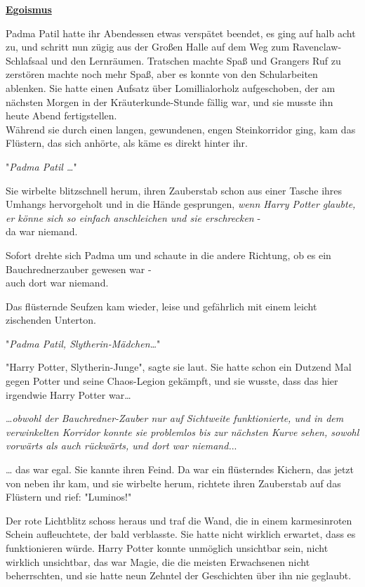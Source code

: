 

\hypertarget{egoismus}{%

\textbf{\uline{Egoismus}}

Padma Patil hatte ihr Abendessen etwas verspätet beendet, es ging auf halb acht zu, und schritt nun zügig aus der Großen Halle auf dem Weg zum Ravenclaw-Schlafsaal und den Lernräumen. Tratschen machte Spaß und Grangers Ruf zu zerstören machte noch mehr Spaß, aber es konnte von den Schularbeiten ablenken. Sie hatte einen Aufsatz über Lomillialorholz aufgeschoben, der am nächsten Morgen in der Kräuterkunde-Stunde fällig war, und sie musste ihn heute Abend fertigstellen.\\ Während sie durch einen langen, gewundenen, engen Steinkorridor ging, kam das Flüstern, das sich anhörte, als käme es direkt hinter ihr.

"\emph{Padma Patil …}"

Sie wirbelte blitzschnell herum, ihren Zauberstab schon aus einer Tasche ihres Umhangs hervorgeholt und in die Hände gesprungen, \emph{wenn Harry Potter glaubte, er könne sich so einfach anschleichen und sie erschrecken} -\\ da war niemand.

Sofort drehte sich Padma um und schaute in die andere Richtung, ob es ein Bauchrednerzauber gewesen war -\\ auch dort war niemand.

Das flüsternde Seufzen kam wieder, leise und gefährlich mit einem leicht zischenden Unterton.

"\emph{Padma Patil, Slytherin-Mädchen…}"

"Harry Potter, Slytherin-Junge", sagte sie laut. Sie hatte schon ein Dutzend Mal gegen Potter und seine Chaos-Legion gekämpft, und sie wusste, dass das hier irgendwie Harry Potter war…

…\emph{obwohl der Bauchredner-Zauber nur auf Sichtweite funktionierte, und in dem verwinkelten Korridor konnte sie problemlos bis zur nächsten Kurve sehen, sowohl vorwärts als auch rückwärts, und dort war niemand.}..

… das war egal. Sie kannte ihren Feind. Da war ein flüsterndes Kichern, das jetzt von neben ihr kam, und sie wirbelte herum, richtete ihren Zauberstab auf das Flüstern und rief: "Luminos!"

Der rote Lichtblitz schoss heraus und traf die Wand, die in einem karmesinroten Schein aufleuchtete, der bald verblasste. Sie hatte nicht wirklich erwartet, dass es funktionieren würde. Harry Potter konnte unmöglich unsichtbar sein, nicht wirklich unsichtbar, das war Magie, die die meisten Erwachsenen nicht beherrschten, und sie hatte neun Zehntel der Geschichten über ihn nie geglaubt.

}

